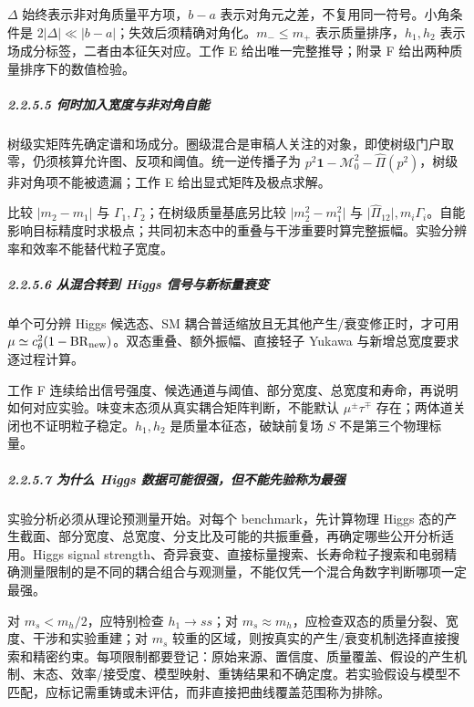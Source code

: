\documentclass[
  chinese,
  UTF8]{ctexart}
\begin{document}
\(\Delta\) 始终表示非对角质量平方项，\(b-a\)
表示对角元之差，不复用同一符号。小角条件是
\(2\lvert\Delta\rvert\ll\lvert b-a\rvert\)；失效后须精确对角化。\(m_-\le m_+\)
表示质量排序，\(h_1,h_2\) 表示场成分标签，二者由本征矢对应。工作 E
给出唯一完整推导；附录 F 给出两种质量排序下的数值检验。

\subparagraph{2.2.5.5
何时加入宽度与非对角自能}\label{ux4f55ux65f6ux52a0ux5165ux5bbdux5ea6ux4e0eux975eux5bf9ux89d2ux81eaux80fd}

树级实矩阵先确定谱和场成分。圈级混合是审稿人关注的对象，即使树级门户取零，仍须核算允许图、反项和阈值。统一逆传播子为
\(p^2\mathbf1-\mathcal M_0^2-\widehat\Pi(p^2)\)，树级非对角项不能被遗漏；工作
E 给出显式矩阵及极点求解。

比较 \(\lvert m_2-m_1\rvert\) 与
\(\Gamma_1,\Gamma_2\)；在树级质量基底另比较 \(\lvert m_2^2-m_1^2\rvert\)
与
\(\lvert\widehat\Pi_{12}\rvert,m_i\Gamma_i\)。自能影响目标精度时求极点；共同初末态中的重叠与干涉重要时算完整振幅。实验分辨率和效率不能替代粒子宽度。

\subparagraph{2.2.5.6 从混合转到 Higgs
信号与新标量衰变}\label{ux4eceux6df7ux5408ux8f6cux5230-higgs-ux4fe1ux53f7ux4e0eux65b0ux6807ux91cfux8870ux53d8}

单个可分辨 Higgs 候选态、SM 耦合普适缩放且无其他产生/衰变修正时，才可用
\(\mu\simeq c_\theta^2(1-\mathrm{BR}_{\rm new})\)。双态重叠、额外振幅、直接轻子
Yukawa 与新增总宽度要求逐过程计算。

工作 F
连续给出信号强度、候选通道与阈值、部分宽度、总宽度和寿命，再说明如何对应实验。味变末态须从真实耦合矩阵判断，不能默认
\(\mu^\pm\tau^\mp\) 存在；两体道关闭也不证明粒子稳定。\(h_1,h_2\)
是质量本征态，破缺前复场 \(S\) 不是第三个物理标量。

\subparagraph{2.2.5.7 为什么 Higgs
数据可能很强，但不能先验称为最强}\label{ux4e3aux4ec0ux4e48-higgs-ux6570ux636eux53efux80fdux5f88ux5f3aux4f46ux4e0dux80fdux5148ux9a8cux79f0ux4e3aux6700ux5f3a}

实验分析必须从理论预测量开始。对每个 benchmark，先计算物理 Higgs
态的产生截面、部分宽度、总宽度、分支比及可能的共振重叠，再确定哪些公开分析适用。Higgs
signal
strength、奇异衰变、直接标量搜索、长寿命粒子搜索和电弱精确测量限制的是不同的耦合组合与观测量，不能仅凭一个混合角数字判断哪项一定最强。

对 \(m_s<m_h/2\)，应特别检查 \(h_1\to ss\)；对
\(m_s\approx m_h\)，应检查双态的质量分裂、宽度、干涉和实验重建；对
\(m_s\)
较重的区域，则按真实的产生/衰变机制选择直接搜索和精密约束。每项限制都要登记：原始来源、置信度、质量覆盖、假设的产生机制、末态、效率/接受度、模型映射、重铸结果和不确定度。若实验假设与模型不匹配，应标记需重铸或未评估，而非直接把曲线覆盖范围称为排除。
\end{document}
